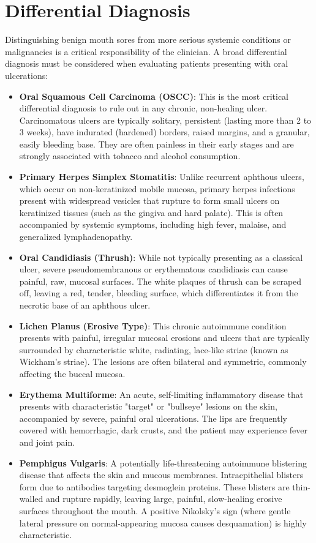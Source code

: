 \section*{Differential Diagnosis}
Distinguishing benign mouth sores from more serious systemic conditions or malignancies is a critical responsibility of the clinician. A broad differential diagnosis must be considered when evaluating patients presenting with oral ulcerations:
\begin{itemize}
    \item \textbf{Oral Squamous Cell Carcinoma (OSCC)}: This is the most critical differential diagnosis to rule out in any chronic, non-healing ulcer. Carcinomatous ulcers are typically solitary, persistent (lasting more than 2 to 3 weeks), have indurated (hardened) borders, raised margins, and a granular, easily bleeding base. They are often painless in their early stages and are strongly associated with tobacco and alcohol consumption.
    \item \textbf{Primary Herpes Simplex Stomatitis}: Unlike recurrent aphthous ulcers, which occur on non-keratinized mobile mucosa, primary herpes infections present with widespread vesicles that rupture to form small ulcers on keratinized tissues (such as the gingiva and hard palate). This is often accompanied by systemic symptoms, including high fever, malaise, and generalized lymphadenopathy.
    \item \textbf{Oral Candidiasis (Thrush)}: While not typically presenting as a classical ulcer, severe pseudomembranous or erythematous candidiasis can cause painful, raw, mucosal surfaces. The white plaques of thrush can be scraped off, leaving a red, tender, bleeding surface, which differentiates it from the necrotic base of an aphthous ulcer.
    \item \textbf{Lichen Planus (Erosive Type)}: This chronic autoimmune condition presents with painful, irregular mucosal erosions and ulcers that are typically surrounded by characteristic white, radiating, lace-like striae (known as Wickham's striae). The lesions are often bilateral and symmetric, commonly affecting the buccal mucosa.
    \item \textbf{Erythema Multiforme}: An acute, self-limiting inflammatory disease that presents with characteristic "target" or "bullseye" lesions on the skin, accompanied by severe, painful oral ulcerations. The lips are frequently covered with hemorrhagic, dark crusts, and the patient may experience fever and joint pain.
    \item \textbf{Pemphigus Vulgaris}: A potentially life-threatening autoimmune blistering disease that affects the skin and mucous membranes. Intraepithelial blisters form due to antibodies targeting desmoglein proteins. These blisters are thin-walled and rupture rapidly, leaving large, painful, slow-healing erosive surfaces throughout the mouth. A positive Nikolsky's sign (where gentle lateral pressure on normal-appearing mucosa causes desquamation) is highly characteristic.

\end{itemize}
